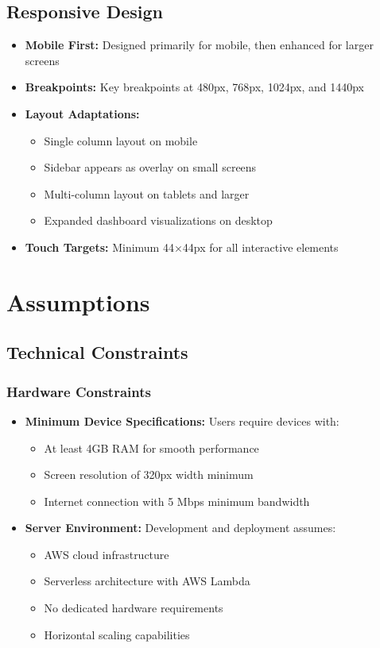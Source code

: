 \documentclass[a4paper, 11pt]{scrreprt}
\begin{document}
\section{Responsive Design}
\begin{itemize}
    \item \textbf{Mobile First:} Designed primarily for mobile, then enhanced for larger screens
    \item \textbf{Breakpoints:} Key breakpoints at 480px, 768px, 1024px, and 1440px
    \item \textbf{Layout Adaptations:} 
    \begin{itemize}
        \item Single column layout on mobile
        \item Sidebar appears as overlay on small screens
        \item Multi-column layout on tablets and larger
        \item Expanded dashboard visualizations on desktop
    \end{itemize}
    \item \textbf{Touch Targets:} Minimum 44×44px for all interactive elements
\end{itemize}

\chapter{Assumptions}

\section{Technical Constraints}

\subsection{Hardware Constraints}
\begin{itemize}
    \item \textbf{Minimum Device Specifications:} Users require devices with:
    \begin{itemize}
        \item At least 4GB RAM for smooth performance
        \item Screen resolution of 320px width minimum
        \item Internet connection with 5 Mbps minimum bandwidth
    \end{itemize}
    
    \item \textbf{Server Environment:} Development and deployment assumes:
    \begin{itemize}
        \item AWS cloud infrastructure
        \item Serverless architecture with AWS Lambda
        \item No dedicated hardware requirements
        \item Horizontal scaling capabilities
    \end{itemize}
\end{itemize}
\end{document}
